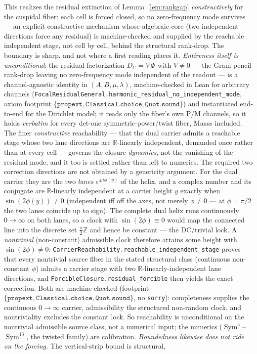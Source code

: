 \documentclass[11pt]{article}
\theoremstyle{definition}
\newcommand{\Sym}{\operatorname{Sym}}
\begin{document}
\noindent This realizes the residual extinction of Lemma~\ref{lem:rankgap} \emph{constructively} for the cuspidal
fiber: each cell is forced closed, so no zero-frequency mode survives --- an explicit constructive mechanism whose
algebraic core (two independent directions force any residual) is machine-checked and supplied by the reachable
independent stage, not cell by cell, behind the structural rank-drop. The boundary is sharp, and not where a first reading places it. \emph{Entireness itself is
unconditional}: the residual factorization $D_C=V\,\Phi$ with $V\neq0$ --- the Gram-pencil rank-drop leaving no
zero-frequency mode independent of the readout --- is a channel-agnostic identity in $(A,B,\mu,\lambda)$,
machine-checked in Lean for arbitrary channels
(\texttt{FocalResidualGeneral.harmonic\_residual\_no\_independent\_mode}, axiom footprint
$\{\texttt{propext},\texttt{Classical.choice},\texttt{Quot.sound}\}$) and instantiated end-to-end for the
Dirichlet model; it reads only the fiber's own P/M channels, so it holds \emph{verbatim} for every det-one
symmetric-power/twist fiber, Maass included. The finer \emph{constructive} reachability --- that the dual carrier admits a reachable stage whose two lane directions are $\mathbb R$-linearly independent, demanded once rather than at every cell --- governs the closure \emph{dynamics}, not the vanishing of the residual mode, and it too is settled rather than left to numerics. The required two correction directions are not obtained by a genericity argument. For the dual carrier they are the two \emph{lanes} $e^{\pm i\phi(y)}$ of the helix, and a complex number and its conjugate are $\mathbb R$-linearly independent at a carrier height $y$ exactly when $\sin(2\phi(y))\neq0$ (independent iff off the axes, not merely $\phi\neq0$ --- at $\phi=\pi/2$ the two lanes coincide up to sign). The complete dual helix runs continuously $0\to\infty$ on both lanes, so a clock with $\sin(2\phi)\equiv0$ would map the connected line into the discrete set $\tfrac{\pi}{2}\mathbb Z$ and hence be constant --- the DC/trivial lock. A \emph{nontrivial} (non-constant) admissible clock therefore attains some height with $\sin(2\phi)\neq0$: \texttt{CarrierReachability.reachable\_independent\_stage} proves that every nontrivial source fiber in the stated structural class (continuous non-constant $\phi$) admits a carrier stage with two $\mathbb R$-linearly-independent lane directions, and \texttt{ForcibleClosure.residual\_forcible} then yields the exact correction. Both are machine-checked (footprint $\{\texttt{propext},\texttt{Classical.choice},\texttt{Quot.sound}\}$, no \texttt{sorry}): completeness supplies the continuous $0\to\infty$ carrier, admissibility the structured non-random clock, and nontriviality excludes the constant lock. So reachability is unconditional on the nontrivial admissible source class, not a numerical input; the numerics ($\Sym^5$--$\Sym^{13}$, the twisted family) are calibration. \emph{Boundedness likewise does not ride on the forcing.} The vertical-strip bound is structural,
\end{document}
